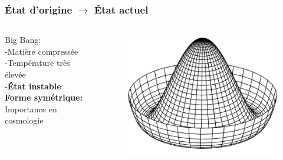 \documentclass[handout]{beamer}
\begin{document}
\begin{frame}\frametitle{État d'origine $\rightarrow$ État actuel}
\begin{columns}[T]
 \begin{column}[T]{.5\linewidth}
 Big Bang:\\ -Matière compressée\\ -Température très élevée\\ -\textbf{État instable}\\[1 cm]
 \textbf{Forme symétrique:} Importance en cosmologie 
 \end{column}
 \begin{column}[T]{.5\linewidth}
 \begin{figure}[0.5\textwidth]
  \includegraphics[scale=0.25]{chapeau_mex.png}
 \end{figure}
 \end{column}
\end{columns}
\end{frame}


\end{document}

